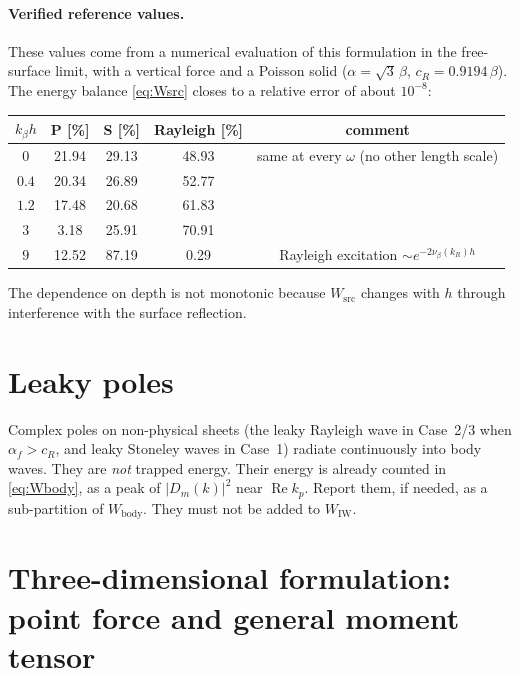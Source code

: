 \documentclass[11pt,a4paper]{article}
\newcommand{\RE}{\operatorname{Re}}
\begin{document}
\paragraph{Verified reference values.} These values come from a numerical evaluation of this
formulation in the free-surface limit, with a vertical force and a Poisson solid
($\alpha=\sqrt3\,\beta$, $c_R=0.9194\,\beta$). The energy balance \eqref{eq:Wsrc} closes to a relative
error of about $10^{-8}$:
\begin{center}
\begin{tabular}{@{}ccccc@{}}
\toprule
$k_\beta h$ & P [\%] & S [\%] & Rayleigh [\%] & comment\\
\midrule
$0$   & 21.94 & 29.13 & 48.93 & same at every $\omega$ (no other length scale)\\
$0.4$ & 20.34 & 26.89 & 52.77 & \\
$1.2$ & 17.48 & 20.68 & 61.83 & \\
$3$   &  3.18 & 25.91 & 70.91 & \\
$9$   & 12.52 & 87.19 &  0.29 & Rayleigh excitation $\sim e^{-2\nu_\beta(k_R)h}$\\
\bottomrule
\end{tabular}
\end{center}
The dependence on depth is not monotonic because $W_{\mathrm{src}}$ changes with $h$ through
interference with the surface reflection.

\section{Leaky poles}
\label{sec:leaky}

Complex poles on non-physical sheets (the leaky Rayleigh wave in Case~2/3 when $\alpha_f>c_R$, and
leaky Stoneley waves in Case~1) radiate continuously into body waves. They are \emph{not} trapped
energy. Their energy is already counted in \eqref{eq:Wbody}, as a peak of $|D_m(k)|^2$ near
$\RE k_p$. Report them, if needed, as a sub-partition of $W_{\mathrm{body}}$. They must not be added
to $W_{\mathrm{IW}}$.

\section{Three-dimensional formulation: point force and general moment tensor}
\label{sec:3d}
\end{document}
